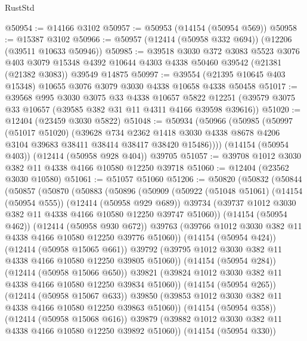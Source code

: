 \begin{lexlean}{RustStd}
\begin{coremodule}
@50954 := @14166 @3102
@50957 := @50953 (@14154 (@50954 @569))
@50958 := @15387 @3102
@50966 := @50957 (@12414 (@50958 @332 @694)) (@12206 (@39511 @10633 @50946))
@50985 := @39518
    @3030
    @372
    @3083
    @5523
    @3076
    @403
    @3079
    @15348
    @4392
    @10644
    @4303
    @4338
    @50460
    @39542
    (@21381 (@21382 @3083))
    @39549
    @14875
@50997 := @39554 (@21395 @10645 @403 @15348) @10655 @3076 @3079 @3030 @4338 @10658 @4338 @50458
@51017 := @39568
    @995
    @3030
    @3075
    @33
    @4338
    @10657
    @5822
    @12251
    (@39579 @3075 @33 @10657 (@39585 @382 @31 @11 @4311 @4166 @39598 @39616))
@51020 := @12404 (@23459 @3030 @5822)
@51048 := @50934
    (@50966
      (@50985
        (@50997
          (@51017 @51020)
          (@39628
            @734
            @2362
            @1418
            @3030
            @4338
            @8678
            @4206
            @3104
            @39683
            @38411
            @38414
            @38417
            @38420
            @15486))))
    (@14154 (@50954 @403))
    (@12414 (@50958 @928 @404))
    @39705
@51057 := @39708 @1012 @3030 @382 @11 @4338 @4166 @10580 @12250 @39718
@51060 := @12404 (@23562 @3030 @10580)
@51061 := @51057 @51060
@51206 := @50820
    (@50832
      (@50844
        (@50857
          (@50870
            (@50883
              (@50896
                (@50909
                  (@50922
                    (@51048 @51061)
                    (@14154 (@50954 @555))
                    (@12414 (@50958 @929 @689))
                    @39734
                    (@39737 @1012 @3030 @382 @11 @4338 @4166 @10580 @12250 @39747 @51060))
                  (@14154 (@50954 @462))
                  (@12414 (@50958 @930 @672))
                  @39763
                  (@39766 @1012 @3030 @382 @11 @4338 @4166 @10580 @12250 @39776 @51060))
                (@14154 (@50954 @424))
                (@12414 (@50958 @15065 @661))
                @39792
                (@39795 @1012 @3030 @382 @11 @4338 @4166 @10580 @12250 @39805 @51060))
              (@14154 (@50954 @284))
              (@12414 (@50958 @15066 @650))
              @39821
              (@39824 @1012 @3030 @382 @11 @4338 @4166 @10580 @12250 @39834 @51060))
            (@14154 (@50954 @265))
            (@12414 (@50958 @15067 @633))
            @39850
            (@39853 @1012 @3030 @382 @11 @4338 @4166 @10580 @12250 @39863 @51060))
          (@14154 (@50954 @358))
          (@12414 (@50958 @15068 @616))
          @39879
          (@39882 @1012 @3030 @382 @11 @4338 @4166 @10580 @12250 @39892 @51060))
        (@14154 (@50954 @330))

\end{coremodule}
\end{lexlean}
